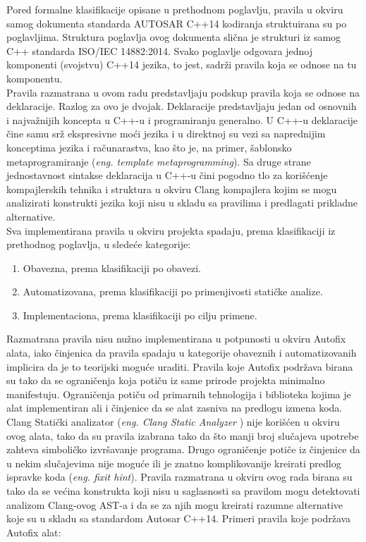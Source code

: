 \documentclass[12pt,oneside]{memoir}
\begin{document}
Pored formalne klasifikacije opisane u prethodnom poglavlju, pravila u okviru samog dokumenta standarda AUTOSAR C++14  kodiranja struktuirana su po poglavljima.
Struktura poglavlja ovog dokumenta slična je strukturi iz samog C++ standarda ISO/IEC 14882:2014. Svako poglavlje odgovara jednoj komponenti (svojstvu) C++14 jezika, to jest, sadrži pravila koja se odnose na tu komponentu.
\\
\indent
Pravila razmatrana u ovom radu predstavljaju podskup pravila koja se odnose na deklaracije. Razlog za ovo je dvojak. Deklaracije predstavljaju jedan
od osnovnih i najvažnijih koncepta u C++-u i programiranju generalno. U C++-u deklaracije čine samu srž ekspresivne moći jezika i u direktnoj su vezi
sa naprednijim konceptima jezika i računarastva, kao što je, na primer, šablonsko metaprogramiranje (\textit{eng. template metaprogramming}).
Sa druge strane jednostavnost sintakse deklaracija u C++-u čini pogodno tlo za korišćenje kompajlerskih tehnika i struktura u okviru Clang kompajlera kojim se mogu analizirati konstrukti jezika koji nisu u skladu sa pravilima i predlagati prikladne alternative.
\\
\indent
Sva implementirana pravila u okviru projekta spadaju, prema klasifikaciji iz prethodnog poglavlja, u sledeće kategorije:
\begin{enumerate}
  \item{Obavezna, prema klasifikaciji po obavezi.}
  \item{Automatizovana, prema klasifikaciji po primenjivosti statičke analize.}
  \item{Implementaciona, prema klasifikaciji po cilju primene.}
\end{enumerate}

Razmatrana pravila nisu nužno implementirana u potpunosti u okviru Autofix alata, iako činjenica da pravila spadaju u kategorije obaveznih i automatizovanih
implicira da je to teorijski moguće uraditi. Pravila koje Autofix podržava birana su tako da se ograničenja koja potiču iz same prirode projekta minimalno manifestuju. Ograničenja potiču od primarnih tehnologija i biblioteka kojima je alat implementiran ali i činjenice da se alat zasniva na predlogu izmena koda. 
Clang Statički analizator (\textit{eng. Clang Static Analyzer} \cite{CSAWebsite}) nije korišćen u okviru ovog alata, tako da su pravila izabrana tako da što manji broj slučajeva upotrebe zahteva simboličko izvršavanje programa. Drugo ograničenje potiče iz činjenice da u nekim slučajevima nije moguće ili je znatno komplikovanije kreirati predlog ispravke koda (\textit{eng. fixit hint}). Pravila razmatrana u okviru ovog rada birana su tako da se većina konstrukta koji nisu u saglasnosti sa pravilom mogu detektovati analizom Clang-ovog AST-a i da se za njih mogu kreirati razumne alternative koje su u skladu sa standardom Autosar C++14.
Primeri pravila koje podržava Autofix alat:
\end{document}
